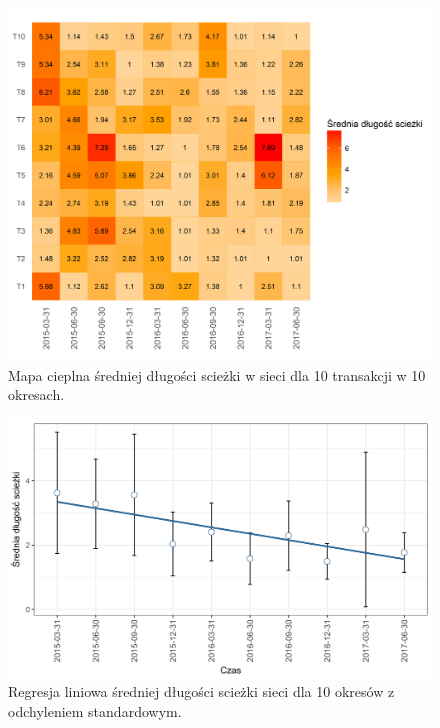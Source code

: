 \documentclass[12pt, twoside, final, openany]{mgr}
\newcommand{\chartsWidth}{0.8}
\begin{document}
\begin{figure}[H]
\centering
  \includegraphics[width=\chartsWidth\linewidth]{pictures/srednia_dlugosc_sciezki/srednia_dlugosc_sciezki_hm.png}
  \caption{Mapa cieplna średniej długości scieżki w sieci dla 10 transakcji w 10 okresach.}
  \label{fig:sds1}
\end{figure}
\begin{figure}[H]
\centering
  \includegraphics[width=\chartsWidth\linewidth]{pictures/srednia_dlugosc_sciezki/srednia_dlugosc_sciezki_sda.png}
  \caption{Regresja liniowa średniej długości scieżki sieci dla 10 okresów z odchyleniem standardowym.}
  \label{fig:sds2}
\end{figure}

\newpage
\end{document}
